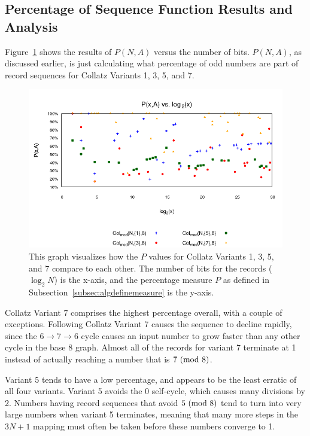 \subsection{Percentage of Sequence Function Results and Analysis} \label{subsubsec:algsinpercentage}
 Figure~\ref{fig:pvslog} shows the results of $P(N,A)$ versus the number of bits. $P(N,A)$, as discussed earlier, is just calculating what percentage of odd numbers are part of record sequences for Collatz Variants 1, 3, 5, and 7. \par
\begin{figure}
    \centering
    \includegraphics[scale=0.6]{ModAvoidanceAnalysisPics/P_vs_log.png}
    \caption{This graph visualizes how the $P$ values for Collatz Variants 1, 3, 5, and 7 compare to each other. The number of bits for the records ($\log_2{N}$) is the x-axis, and the percentage measure $P$ as defined in Subsection~\ref{subsec:algdefinemeasure} is the y-axis.}
    \label{fig:pvslog}
\end{figure}
Collatz Variant 7 comprises the highest percentage overall, with a couple of exceptions. Following Collatz Variant 7 causes the sequence to decline rapidly, since the $6 \rightarrow 7 \rightarrow 6$ cycle causes an input number to grow faster than any other cycle in the base 8 graph. Almost all of the records for variant 7 terminate at 1 instead of actually reaching a number that is $7 \ (\mathrm{mod}\ 8)$. \par
Variant 5 tends to have a low percentage, and appears to be the least erratic of all four variants. Variant 5 avoids the 0 self-cycle, which causes many divisions by 2. Numbers having record sequences that avoid $5 \ (\mathrm{mod}\ 8)$ tend to turn into very large numbers when variant 5 terminates, meaning that many more steps in the $3N+1$ mapping must often be taken before these numbers converge to 1. \par
